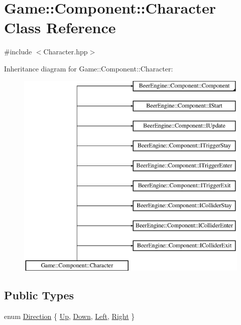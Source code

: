 \hypertarget{class_game_1_1_component_1_1_character}{}\section{Game\+:\+:Component\+:\+:Character Class Reference}
\label{class_game_1_1_component_1_1_character}


{\ttfamily \#include $<$Character.\+hpp$>$}

Inheritance diagram for Game\+:\+:Component\+:\+:Character\+:\begin{figure}[H]
\begin{center}
\leavevmode
\includegraphics[height=10.000000cm]{class_game_1_1_component_1_1_character}
\end{center}
\end{figure}
\subsection*{Public Types}
\begin{DoxyCompactItemize}
\item 
enum \mbox{\hyperlink{class_game_1_1_component_1_1_character_aa1b80f780538b76c7a948e96c54dbe87}{Direction}} \{ \mbox{\hyperlink{class_game_1_1_component_1_1_character_aa1b80f780538b76c7a948e96c54dbe87a54502c7393e5366db0d2ae48a65ab8ea}{Up}}, 
\mbox{\hyperlink{class_game_1_1_component_1_1_character_aa1b80f780538b76c7a948e96c54dbe87a06bbbd9d7113d4de804ccfc8f302a361}{Down}}, 
\mbox{\hyperlink{class_game_1_1_component_1_1_character_aa1b80f780538b76c7a948e96c54dbe87a19e0f8a04342229f6eda11d3c7207d42}{Left}}, 
\mbox{\hyperlink{class_game_1_1_component_1_1_character_aa1b80f780538b76c7a948e96c54dbe87a77889f2be386690b9c403e68c32f38a7}{Right}}
 \}
\end{DoxyCompactItemize}
